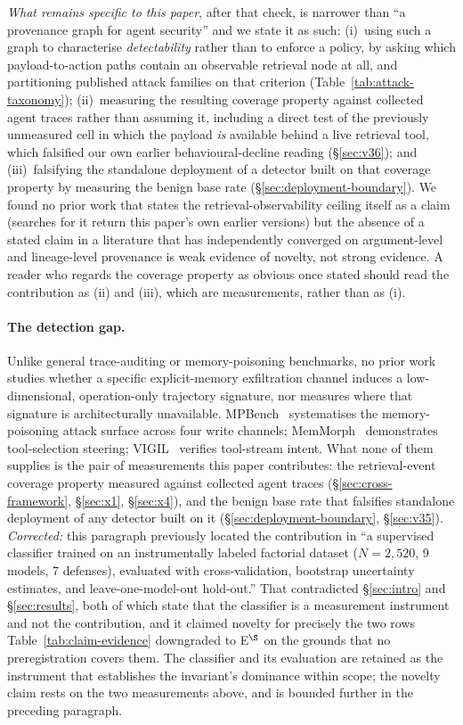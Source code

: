 \documentclass{article}
\begin{document}
\emph{What remains specific to this paper}, after that check, is narrower than ``a provenance graph for agent security'' and we state it as such: (i)~using such a graph to characterise \emph{detectability} rather than to enforce a policy, by asking which payload-to-action paths contain an observable retrieval node at all, and partitioning published attack families on that criterion (Table~\ref{tab:attack-taxonomy}); (ii)~measuring the resulting coverage property against collected agent traces rather than assuming it, including a direct test of the previously unmeasured cell in which the payload \emph{is} available behind a live retrieval tool, which falsified our own earlier behavioural-decline reading (\S\ref{sec:v36}); and (iii)~falsifying the standalone deployment of a detector built on that coverage property by measuring the benign base rate (\S\ref{sec:deployment-boundary}). We found no prior work that states the retrieval-observability ceiling itself as a claim (searches for it return this paper's own earlier versions) but the absence of a stated claim in a literature that has independently converged on argument-level and lineage-level provenance is weak evidence of novelty, not strong evidence. A reader who regards the coverage property as obvious once stated should read the contribution as (ii) and (iii), which are measurements, rather than as (i).

\paragraph{The detection gap.} Unlike general trace-auditing or memory-poisoning benchmarks, no prior work studies whether a specific explicit-memory exfiltration channel induces a low-dimensional, operation-only trajectory signature, nor measures where that signature is architecturally unavailable. MPBench~\citep{dash2026mpbench} systematises the memory-poisoning attack surface across four write channels; MemMorph~\citep{zhang2026memmorph} demonstrates tool-selection steering; VIGIL~\citep{li2026vigil} verifies tool-stream intent. What none of them supplies is the pair of measurements this paper contributes: the retrieval-event coverage property measured against collected agent traces (\S\ref{sec:cross-framework}, \S\ref{sec:x1}, \S\ref{sec:x4}), and the benign base rate that falsifies standalone deployment of any detector built on it (\S\ref{sec:deployment-boundary}, \S\ref{sec:v35}). \emph{Corrected:} this paragraph previously located the contribution in ``a supervised classifier trained on an instrumentally labeled factorial dataset ($N{=}2{,}520$, 9 models, 7 defenses), evaluated with cross-validation, bootstrap uncertainty estimates, and leave-one-model-out hold-out.'' That contradicted \S\ref{sec:intro} and \S\ref{sec:results}, both of which state that the classifier is a measurement instrument and not the contribution, and it claimed novelty for precisely the two rows Table~\ref{tab:claim-evidence} downgraded to E$^{\S}$ on the grounds that no preregistration covers them. The classifier and its evaluation are retained as the instrument that establishes the invariant's dominance within scope; the novelty claim rests on the two measurements above, and is bounded further in the preceding paragraph.
\end{document}
